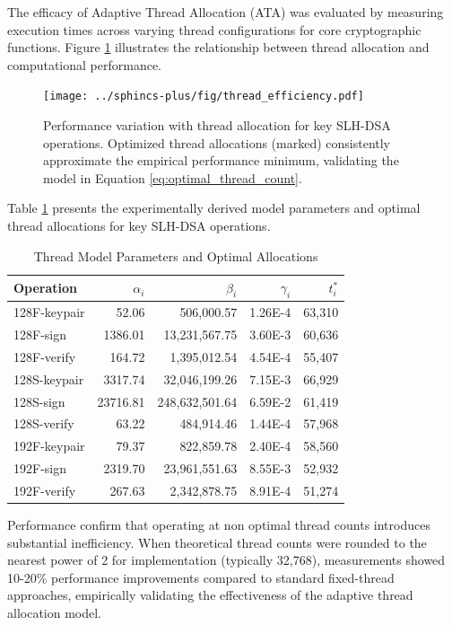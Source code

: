 \documentclass[journal]{IEEEtran}
\begin{document}
The efficacy of Adaptive Thread Allocation (ATA) was evaluated by measuring execution times across varying thread configurations for core cryptographic functions. Figure \ref{fig:thread_efficiency} illustrates the relationship between thread allocation and computational performance.

\begin{figure}[htbp]
  \centering
  \texttt{[image: ../sphincs-plus/fig/thread\_efficiency.pdf]}
  \caption{Performance variation with thread allocation for key SLH-DSA operations. Optimized thread allocations (marked) consistently approximate the empirical performance minimum, validating the model in Equation \ref{eq:optimal_thread_count}.}
  \label{fig:thread_efficiency}
\end{figure}

Table \ref{tab:thread_model_params} presents the experimentally derived model parameters and optimal thread allocations for key SLH-DSA operations.

\begin{table}[h]
  \centering
  \caption{Thread Model Parameters and Optimal Allocations}
  \label{tab:thread_model_params}
  \begin{tabular}{@{}lrrrr@{}}
    \toprule
    \textbf{Operation} & \boldmath$\alpha_i$ & \boldmath$\beta_i$ & \boldmath$\gamma_i$ & \boldmath$t_i^*$ \\
    \midrule
    128F-keypair & 52.06 & 506,000.57 & 1.26E-4 & 63,310 \\
    128F-sign & 1386.01 & 13,231,567.75 & 3.60E-3 & 60,636 \\
    128F-verify & 164.72 & 1,395,012.54 & 4.54E-4 & 55,407 \\
    128S-keypair & 3317.74 & 32,046,199.26 & 7.15E-3 & 66,929 \\
    128S-sign & 23716.81 & 248,632,501.64 & 6.59E-2 & 61,419 \\
    128S-verify & 63.22 & 484,914.46 & 1.44E-4 & 57,968 \\
    192F-keypair & 79.37 & 822,859.78 & 2.40E-4 & 58,560 \\
    192F-sign & 2319.70 & 23,961,551.63 & 8.55E-3 & 52,932 \\
    192F-verify & 267.63 & 2,342,878.75 & 8.91E-4 & 51,274 \\
    \bottomrule
  \end{tabular}
\end{table}

Performance confirm that operating at non optimal thread counts introduces substantial inefficiency.
When theoretical thread counts were rounded to the nearest power of 2 for implementation (typically 32,768), measurements showed 10-20\% performance improvements compared to standard fixed-thread approaches, empirically validating the effectiveness of the adaptive thread allocation model.
\end{document}
